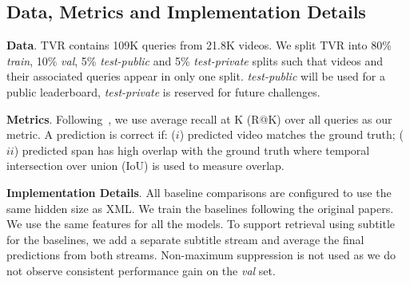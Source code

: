 \documentclass[runningheads]{llncs}
\begin{document}
\subsection{Data, Metrics and Implementation Details}
\noindent\textbf{Data}.
TVR contains 109K queries from 21.8K videos. 
We split TVR into 80\% \textit{train}, 10\% \textit{val}, 5\% \textit{test-public} and 5\% \textit{test-private} splits such that videos and their associated queries appear in only one split. 
\textit{test-public} will be used for a public leaderboard, \textit{test-private} is reserved for future challenges. 

\kern1mm
\noindent\textbf{Metrics}.
Following~\cite{escorcia2019temporal,gao2017tall}, we use average recall at K (R@K) over all queries as our metric. 
A prediction is correct if: ($i$) predicted video matches the ground truth; ($ii$) predicted span has high overlap with the ground truth where 
temporal intersection over union (IoU) is used to measure overlap. 

\kern1mm
\noindent\textbf{Implementation Details}.
All baseline comparisons are configured to use the same hidden size as XML. We train the baselines following the original papers.
We use the same features for all the models. 
To support retrieval using subtitle for the baselines, we add a separate subtitle stream and average the final predictions from both streams.
Non-maximum suppression is not used as we do not observe consistent performance gain on the \textit{val} set. 
\end{document}
